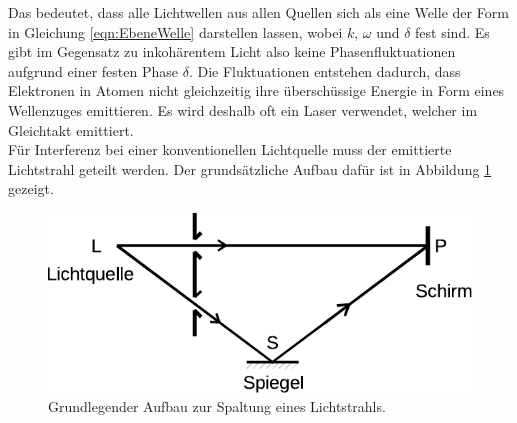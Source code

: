     Das bedeutet,
    dass alle Lichtwellen aus allen Quellen sich als eine Welle der Form in Gleichung \eqref{eqn:EbeneWelle} darstellen lassen,
    wobei $k$, $\omega$ und $\delta$ fest sind.
    Es gibt im Gegensatz zu inkohärentem Licht also keine Phasenfluktuationen aufgrund einer festen Phase $\delta$.
    Die Fluktuationen entstehen dadurch, 
    dass Elektronen in Atomen nicht gleichzeitig ihre überschüssige Energie in Form eines Wellenzuges emittieren.
    Es wird deshalb oft ein Laser verwendet,
    welcher im Gleichtakt emittiert.\\
    Für Interferenz bei einer konventionellen Lichtquelle muss der emittierte Lichtstrahl geteilt werden.
    Der grundsätzliche Aufbau dafür ist in Abbildung \ref{fig:Lichtspaltung} gezeigt.

    \begin{figure}
        \centering
        \includegraphics{content/img/Abb_1.pdf}
        \caption{Grundlegender Aufbau zur Spaltung eines Lichtstrahls.}
        \label{fig:Lichtspaltung}
    \end{figure}

